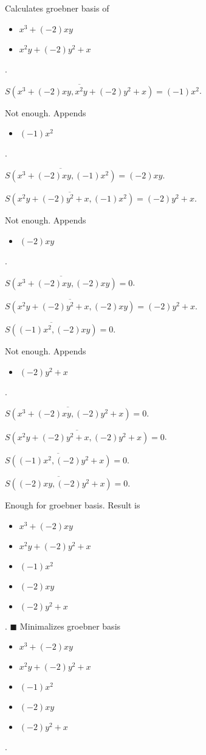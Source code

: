 \documentclass{jsarticle}
\begin{document}
\section{}Calculates groebner basis of 
\begin{itemize}
\item $x^{3}+(-2)xy$
\item $x^{2}y+(-2)y^{2}+x$
\end{itemize}  . 


$\overline{S(x^{3}+(-2)xy, x^{2}y+(-2)y^{2}+x)} = (-1)x^{2}$.  

Not enough.  Appends \begin{itemize}
\item $(-1)x^{2}$
\end{itemize}  . 


$\overline{S(x^{3}+(-2)xy, (-1)x^{2})} = (-2)xy$.  

$\overline{S(x^{2}y+(-2)y^{2}+x, (-1)x^{2})} = (-2)y^{2}+x$.  

Not enough.  Appends \begin{itemize}
\item $(-2)xy$
\end{itemize}  . 


$\overline{S(x^{3}+(-2)xy, (-2)xy)} = 0$.  

$\overline{S(x^{2}y+(-2)y^{2}+x, (-2)xy)} = (-2)y^{2}+x$.  

$\overline{S((-1)x^{2}, (-2)xy)} = 0$.  

Not enough.  Appends \begin{itemize}
\item $(-2)y^{2}+x$
\end{itemize}  . 


$\overline{S(x^{3}+(-2)xy, (-2)y^{2}+x)} = 0$.  

$\overline{S(x^{2}y+(-2)y^{2}+x, (-2)y^{2}+x)} = 0$.  

$\overline{S((-1)x^{2}, (-2)y^{2}+x)} = 0$.  

$\overline{S((-2)xy, (-2)y^{2}+x)} = 0$.  

Enough for groebner basis.  Result is \begin{itemize}
\item $x^{3}+(-2)xy$
\item $x^{2}y+(-2)y^{2}+x$
\item $(-1)x^{2}$
\item $(-2)xy$
\item $(-2)y^{2}+x$
\end{itemize}  . 
$\blacksquare{}$
Minimalizes groebner basis 
\begin{itemize}
\item $x^{3}+(-2)xy$
\item $x^{2}y+(-2)y^{2}+x$
\item $(-1)x^{2}$
\item $(-2)xy$
\item $(-2)y^{2}+x$
\end{itemize}  . 
\end{document}
